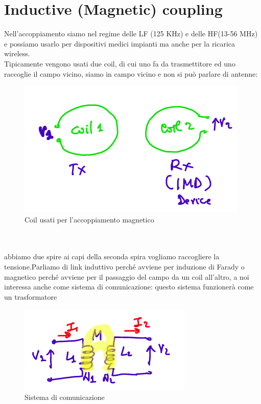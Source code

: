 \documentclass[oneside, 12pt]{extbook}
\begin{document}
\section{Inductive (Magnetic) coupling}
Nell'accoppiamento siamo nel regime delle LF (125 KHz) e delle HF(13-56 MHz)
e possiamo usarlo per dispositivi medici impianti ma anche per la ricarica wireless.\\Tipicamente vengono usati due coil, di cui uno fa da trasmettitore ed uno raccoglie il campo vicino, siamo in campo vicino e non si può parlare di antenne:\\
\begin{figure}[!h]
	\includegraphics[scale=0.7]{immagini/spire.png}
	\caption{Coil usati per l'accoppiamento magnetico}
\end{figure}\\\\
abbiamo due spire ai capi della seconda spira vogliamo raccogliere la tensione.Parliamo di link induttivo perché avviene per induzione di Farady o magnetico perché avviene per il passaggio del campo da un coil all'altro, a noi interessa anche come sistema di comunicazione: questo sistema funzionerà come un trasformatore
 \\
 \begin{figure}[!h]
 	\includegraphics[scale=0.7]{immagini/trasf.png}
 	\caption{Sistema di comunicazione}
 \end{figure}\\\\
\end{document}
